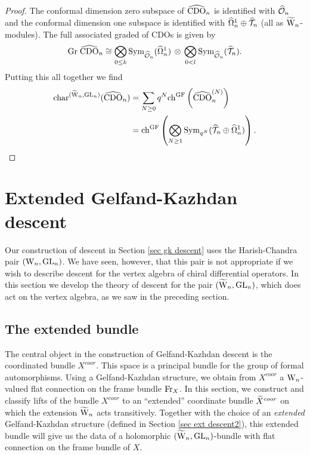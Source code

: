 \begin{proof}
The conformal dimension zero subspace of $\hCDO_n$ is identified with $\hO_n$ and the conformal dimension one subspace is identified with $\hOmega^1_n \oplus \hT_n$ (all as $\TVect$-modules). The full associated graded of CDOs is given by
\[
\Gr \; \hCDO_n \cong
\underset{{0\leq k}}{\bigotimes} \,\Sym_{\hO_n}(\hOmega^1_n)\,
\otimes \, \underset{{0<
    l}}{\bigotimes} \,\Sym_{\hO_n}(\hT_n) .
\]
Putting this all together we find
\begin{align*}
{\rm char}^{(\TVect, \GL_n)} (\hCDO_n) & = \sum_{N \geq 0} q^N {\rm
                                         ch}^{\GF}\left(\hCDO_n^{(N)}\right)
  \\ & = \ch^{\rm GF} \left(\bigotimes_{N \geq 1} \Sym_{q^N} (\hT_n \oplus
       \hOmega^1_n) \right) .
\end{align*}
\end{proof}


\section{Extended Gelfand-Kazhdan descent} \label{sec ext desc}

Our construction of descent in Section \ref{sec gk descent} uses the Harish-Chandra pair $(\Vect, \GL_n)$. 
We have seen, however, that this pair is not appropriate 
if we wish to describe descent for the vertex algebra of chiral differential operators. 
In this section we develop the theory of descent for the pair $(\TVect, \GL_n)$, 
which does act on the vertex algebra, as we saw in the preceding section. 

\subsection{The extended bundle}
The central object in the construction of Gelfand-Kazhdan descent is the coordinated bundle $X^{coor}$. 
This space is a principal bundle for the group of formal automorphisms. 
Using a Gelfand-Kazhdan structure, we obtain from $X^{coor}$ a $\Vect$-valued flat connection on the frame bundle $\Fr_X$. 
In this section, we construct and classify lifts of the bundle $X^{coor}$ 
to an ``extended'' coordinate bundle $\Tilde{X}^{coor}$ on which the extension $\TVect$ acts transitively. 
Together with the choice of an {\em extended} Gelfand-Kazhdan structure (defined in Section \ref{sec ext descent2}), 
this extended bundle will give us the data of a holomorphic $(\TVect, \GL_n)$-bundle with flat connection on the frame bundle of $X$.

